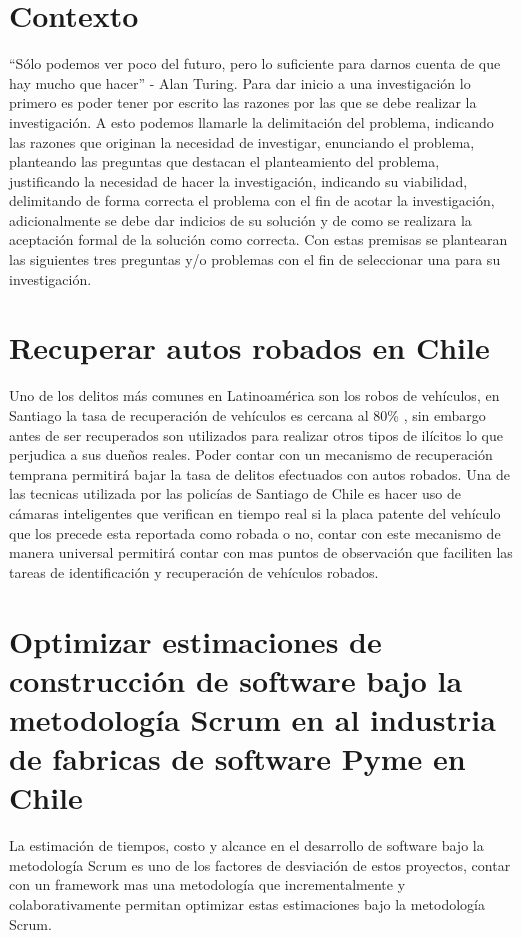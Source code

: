 \documentclass[12pt,letterpaper]{article}
\begin{document}
\section{Contexto}

“Sólo podemos ver poco del futuro, pero lo suficiente para darnos cuenta de que hay mucho que hacer” - Alan Turing.
Para dar inicio a una investigación lo primero es poder tener por escrito las razones por las que se debe realizar la investigación. A esto podemos llamarle la delimitación del problema, indicando las razones que originan la necesidad de investigar, enunciando el problema, planteando las preguntas que destacan  el planteamiento del problema, justificando la necesidad de hacer la investigación, indicando su viabilidad, delimitando de forma correcta el problema con el fin de acotar la investigación, adicionalmente se debe dar indicios de su solución y de como se realizara la aceptación formal de la solución como correcta.
Con estas premisas se plantearan las siguientes tres preguntas y/o problemas con el fin de seleccionar una para su investigación.


\section{Recuperar autos robados en Chile}

Uno de los delitos más comunes en Latinoamérica son los robos de vehículos\autocite{robos}, en Santiago la tasa de recuperación de vehículos es cercana al 80\% \autocite{recupero}, sin embargo antes de ser recuperados son utilizados para realizar otros tipos de ilícitos lo que perjudica a sus dueños reales. Poder contar con un mecanismo de recuperación temprana permitirá bajar la tasa de delitos efectuados con autos robados. Una de las tecnicas utilizada por las policías de Santiago de Chile es hacer uso de cámaras inteligentes\autocite{recono} que verifican en tiempo real si la placa patente del vehículo que los precede esta reportada como robada o no, contar con este mecanismo de manera universal permitirá contar con mas puntos de observación que faciliten las tareas de identificación y recuperación de vehículos robados.

\section{Optimizar estimaciones de construcción de software bajo la metodología Scrum en al industria de fabricas de software Pyme en Chile}
La estimación de tiempos\autocite{estima}, costo y alcance en el desarrollo de software bajo la metodología Scrum es uno de los factores de desviación de estos proyectos, contar con un framework mas una metodología que incrementalmente y colaborativamente permitan optimizar estas estimaciones bajo la metodología Scrum.
\end{document}
